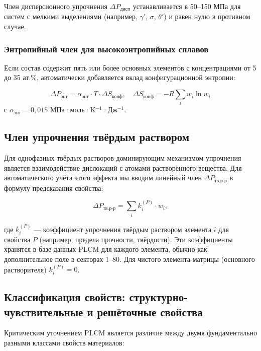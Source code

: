 \documentclass[12pt,a4paper]{article}
\begin{document}
	Член дисперсионного упрочнения $\Delta P_{\text{дисп}}$ устанавливается в 50–150 МПа для систем с мелкими выделениями (например, $\gamma'$, $\sigma$, $\theta'$) и равен нулю в противном случае.
	
	\subsubsection{Энтропийный член для высокоэнтропийных сплавов}
	Если состав содержит пять или более основных элементов с концентрациями от 5 до 35 ат.\%, автоматически добавляется вклад конфигурационной энтропии:
	
	\begin{equation}
		\Delta P_{\text{энт}} = \alpha_{\text{энт}} \cdot T \cdot \Delta S_{\text{конф}}, \quad
		\Delta S_{\text{конф}} = -R \sum_i w_i \ln w_i
	\end{equation}
	с $\alpha_{\text{энт}} = 0,015$ МПа·моль·K\(^{-1}\)·Дж\(^{-1}\).
	
	\subsection{Член упрочнения твёрдым раствором}
	\label{subsec:ss-term}
	
	Для однофазных твёрдых растворов доминирующим механизмом упрочнения является взаимодействие дислокаций с атомами растворённого вещества. Для автоматического учёта этого эффекта мы вводим линейный член $\Delta P_{\text{тв.р-р}}$ в формулу предсказания свойства:
	
	\begin{equation}
		\Delta P_{\text{тв.р-р}} = \sum_i k_i^{(P)} \cdot w_i,
		\label{eq:ss-term}
	\end{equation}
	
	где $k_i^{(P)}$ — коэффициент упрочнения твёрдым раствором элемента $i$ для свойства $P$ (например, предела прочности, твёрдости). Эти коэффициенты хранятся в базе данных PLCM для каждого элемента, обычно как дополнительное поле в секторах 1–80. Для чистого элемента-матрицы (основного растворителя) $k_i^{(P)} = 0$.
	
	\subsection{Классификация свойств: структурно-чувствительные и решёточные свойства}
	\label{subsec:property-class-calibration}
	
	Критическим уточнением PLCM является различие между двумя фундаментально разными классами свойств материалов:
	
\end{document}
